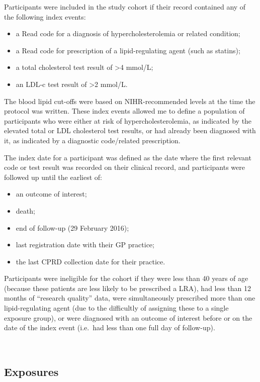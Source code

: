\documentclass[a4paper, twoside]{templates/ociamthesis}
\providecommand{\tightlist}{%
  \setlength{\itemsep}{0pt}\setlength{\parskip}{0pt}}
\begin{document}
Participants were included in the study cohort if their record contained any of the following index events:

\begin{itemize}
\tightlist
\item
  a Read code for a diagnosis of hypercholesterolemia or related condition;
\item
  a Read code for prescription of a lipid-regulating agent (such as statins);
\item
  a total cholesterol test result of \textgreater4 mmol/L;
\item
  an LDL-c test result of \textgreater2 mmol/L.
\end{itemize}

The blood lipid cut-offs were based on NIHR-recommended levels at the time the protocol was written. These index events allowed me to define a population of participants who were either at risk of hypercholesterolemia, as indicated by the elevated total or LDL cholesterol test results, or had already been diagnosed with it, as indicated by a diagnostic code/related prescription.

The index date for a participant was defined as the date where the first relevant code or test result was recorded on their clinical record, and participants were followed up until the earliest of:

\begin{itemize}
\tightlist
\item
  an outcome of interest;
\item
  death;
\item
  end of follow-up (29 February 2016);
\item
  last registration date with their GP practice;
\item
  the last CPRD collection date for their practice.
\end{itemize}

Participants were ineligible for the cohort if they were less than 40 years of age (because these patients are less likely to be prescribed a LRA), had less than 12 months of ``research quality'' data, were simultaneously prescribed more than one lipid-regulating agent (due to the difficultly of assigning these to a single exposure group), or were diagnosed with an outcome of interest before or on the date of the index event (i.e.~had less than one full day of follow-up).

~

\hypertarget{exposures}{%
\subsection{Exposures}\label{exposures}}
\end{document}

